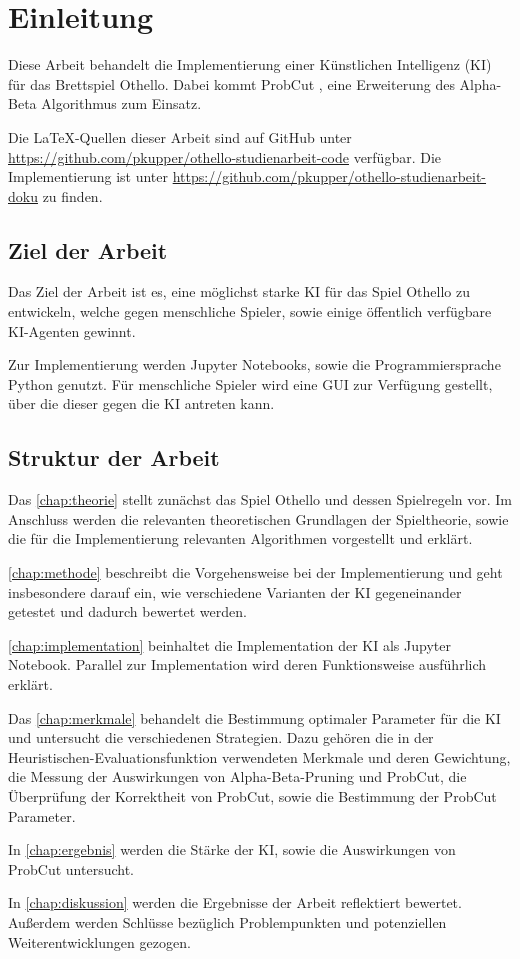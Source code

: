 
\chapter{Einleitung}
\label{chap:einleitung}

Diese Arbeit behandelt die Implementierung einer Künstlichen Intelligenz (\acs{KI}) für das Brettspiel Othello. Dabei kommt ProbCut
\cite[S.~1]{probcut}, eine Erweiterung des Alpha-Beta Algorithmus zum Einsatz.

Die \LaTeX-Quellen dieser Arbeit sind auf GitHub unter \url{https://github.com/pkupper/othello-studienarbeit-code}
verfügbar. Die Implementierung ist unter \url{https://github.com/pkupper/othello-studienarbeit-doku} zu finden.

\section{Ziel der Arbeit}
\label{sec:goal}

Das Ziel der Arbeit ist es, eine möglichst starke \ac{KI} für das Spiel Othello zu entwickeln, welche
gegen menschliche Spieler, sowie einige öffentlich verfügbare \ac{KI}-Agenten gewinnt.

Zur Implementierung werden Jupyter Notebooks, sowie die Programmiersprache Python genutzt.
Für menschliche Spieler wird eine \ac{GUI} zur Verfügung gestellt, über
die dieser gegen die \ac{KI} antreten kann.

\section{Struktur der Arbeit}
Das \autoref{chap:theorie} stellt zunächst das Spiel Othello und dessen Spielregeln vor. Im Anschluss werden die
relevanten theoretischen Grundlagen der Spieltheorie, sowie die für die Implementierung relevanten Algorithmen
vorgestellt und erklärt.

\autoref{chap:methode} beschreibt die Vorgehensweise bei der Implementierung und geht insbesondere darauf ein, wie
verschiedene Varianten der \ac{KI} gegeneinander getestet und dadurch bewertet werden.

\autoref{chap:implementation} beinhaltet die Implementation der \ac{KI} als Jupyter Notebook. Parallel
zur Implementation wird deren Funktionsweise ausführlich erklärt.

Das \autoref{chap:merkmale} behandelt die Bestimmung optimaler Parameter für die \ac{KI} und untersucht die
verschiedenen Strategien. Dazu gehören die in der Heuristischen-Evaluationsfunktion verwendeten Merkmale und deren
Gewichtung, die Messung der Auswirkungen von Alpha-Beta-Pruning und ProbCut, die Überprüfung der Korrektheit von
ProbCut, sowie die Bestimmung der ProbCut Parameter.

In \autoref{chap:ergebnis} werden die Stärke der \ac{KI}, sowie die Auswirkungen von ProbCut untersucht.

In \autoref{chap:diskussion} werden die Ergebnisse der Arbeit reflektiert bewertet. Außerdem werden Schlüsse bezüglich
Problempunkten und potenziellen Weiterentwicklungen gezogen.